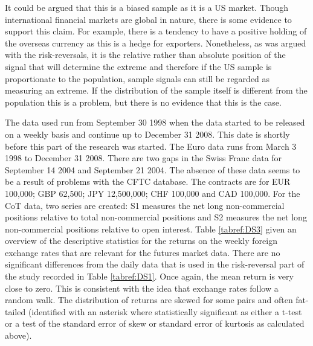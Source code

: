 \documentclass[12pt, a4paper, oneside]{article} %
\begin{document}
It could be argued that this is a biased sample as it is a US market.  Though international financial markets are global in nature, there is some evidence to support this claim.  For example, there is a tendency to have a positive holding of the overseas currency as this is a hedge for exporters.  Nonetheless, as was argued with the risk-reversals, it is the relative rather than absolute position of the signal that will determine the extreme and therefore if the US sample is proportionate to the population, sample signals can still be regarded as measuring an extreme.  If the distribution of the sample itself is different from the population this is a problem, but there is no evidence that this is the case. 

The data used run from September 30 1998 when the data started to be released on a weekly basis and continue up to December 31 2008.  This date is shortly before this part of the research was started. The Euro data runs  from March 3 1998 to December 31 2008.  There are two gaps in the Swiss Franc data for September 14 2004 and September 21 2004.  The absence of these data seems to be a result of problems with the CFTC database.  The contracts are for EUR 100,000; GBP 62,500; JPY 12,500,000; CHF 100,000 and CAD 100,000.  For the CoT data, two series are created:  S1 measures the net long non-commercial positions relative to total non-commercial positions and S2 measures the net long non-commercial positions relative to open interest.  Table \ref{tabref:DS3} given an overview of the descriptive statistics for the returns on the weekly foreign exchange rates that are relevant for the futures market data.  There are no significant differences from the daily data that is used in the risk-reversal part of the study recorded in Table \ref{tabref:DS1}.  Once again, the mean return is very close to zero.  This is consistent with the idea that exchange rates follow a random walk.  The distribution of returns are skewed for some pairs and often fat-tailed (identified with an asterisk where statistically significant as either a t-test or a test of the standard error of skew or standard error of kurtosis as calculated above). 
\end{document}
